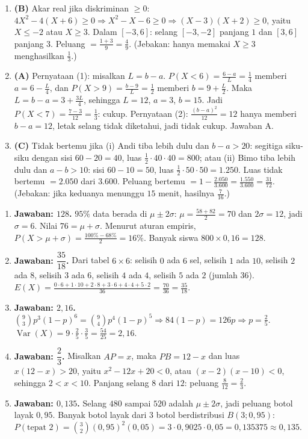 \documentclass[a4paper,11pt]{article}
\newcounter{no}
\newcommand{\Var}{\operatorname{Var}}
\begin{document}
\begin{enumerate}[leftmargin=2em,itemsep=2pt,topsep=2pt]
\item[\textbf{18.}] \textbf{(B)} Akar real jika diskriminan $\ge0$: $4X^2-4(X+6)\ge0\Rightarrow X^2-X-6\ge0\Rightarrow(X-3)(X+2)\ge0$, yaitu $X\le-2$ atau $X\ge3$. Dalam $[-3,6]$: selang $[-3,-2]$ panjang $1$ dan $[3,6]$ panjang $3$. Peluang $=\frac{1+3}{9}=\frac49$. (Jebakan: hanya memakai $X\ge3$ menghasilkan $\frac13$.)
\item[\textbf{19.}] \textbf{(A)} Pernyataan (1): misalkan $L=b-a$. $P(X<6)=\frac{6-a}{L}=\frac14$ memberi $a=6-\frac L4$, dan $P(X>9)=\frac{b-9}{L}=\frac12$ memberi $b=9+\frac L2$. Maka $L=b-a=3+\frac{3L}{4}$, sehingga $L=12$, $a=3$, $b=15$. Jadi $P(X<7)=\frac{7-3}{12}=\frac13$: cukup. Pernyataan (2): $\frac{(b-a)^2}{12}=12$ hanya memberi $b-a=12$, letak selang tidak diketahui, jadi tidak cukup. Jawaban A.
\item[\textbf{20.}] \textbf{(C)} Tidak bertemu jika (i) Andi tiba lebih dulu dan $b-a>20$: segitiga siku-siku dengan sisi $60-20=40$, luas $\frac12\cdot40\cdot40=800$; atau (ii) Bimo tiba lebih dulu dan $a-b>10$: sisi $60-10=50$, luas $\frac12\cdot50\cdot50=1.250$. Luas tidak bertemu $=2.050$ dari $3.600$. Peluang bertemu $=1-\frac{2.050}{3.600}=\frac{1.550}{3.600}=\frac{31}{72}$. (Jebakan: jika keduanya menunggu $15$ menit, hasilnya $\frac7{16}$.)
\end{enumerate}
\par{}\par\vspace{0.2em}
\small\begin{enumerate}[leftmargin=2em,itemsep=2pt,topsep=2pt]
\item[\textbf{1.}] \textbf{Jawaban: $128$.} $95\%$ data berada di $\mu\pm2\sigma$: $\mu=\frac{58+82}{2}=70$ dan $2\sigma=12$, jadi $\sigma=6$. Nilai $76=\mu+\sigma$. Menurut aturan empiris, $P(X>\mu+\sigma)=\frac{100\%-68\%}{2}=16\%$. Banyak siswa $800\times0{,}16=128$.
\item[\textbf{2.}] \textbf{Jawaban: $\dfrac{35}{18}$.} Dari tabel $6\times6$: selisih $0$ ada $6$ sel, selisih $1$ ada $10$, selisih $2$ ada $8$, selisih $3$ ada $6$, selisih $4$ ada $4$, selisih $5$ ada $2$ (jumlah $36$). $E(X)=\frac{0\cdot6+1\cdot10+2\cdot8+3\cdot6+4\cdot4+5\cdot2}{36}=\frac{70}{36}=\frac{35}{18}$.
\item[\textbf{3.}] \textbf{Jawaban: $2{,}16$.} $\binom93p^3(1-p)^6=\binom94p^4(1-p)^5\Rightarrow84(1-p)=126p\Rightarrow p=\frac25$. $\Var(X)=9\cdot\frac25\cdot\frac35=\frac{54}{25}=2{,}16$.
\item[\textbf{4.}] \textbf{Jawaban: $\dfrac23$.} Misalkan $AP=x$, maka $PB=12-x$ dan luas $x(12-x)>20$, yaitu $x^2-12x+20<0$, atau $(x-2)(x-10)<0$, sehingga $2<x<10$. Panjang selang $8$ dari $12$: peluang $\frac{8}{12}=\frac23$.
\item[\textbf{5.}] \textbf{Jawaban: $0{,}135$.} Selang $480$ sampai $520$ adalah $\mu\pm2\sigma$, jadi peluang botol layak $0{,}95$. Banyak botol layak dari $3$ botol berdistribusi $B(3;0{,}95)$: $P(\text{tepat }2)=\binom32(0{,}95)^2(0{,}05)=3\cdot0{,}9025\cdot0{,}05=0{,}135375\approx0{,}135$.
\end{enumerate}
\end{document}
